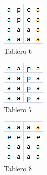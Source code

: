 \begin{figure}[htb]
  \begin{center}
      \includegraphics[scale=1]{imagenes/tab6.png}
  \end{center}
  \caption{Tablero 6}\label{fig:tab6}
\end{figure}

\begin{figure}[htb]
  \begin{center}
      \includegraphics[scale=1]{imagenes/tab7.png}
  \end{center}
  \caption{Tablero 7}\label{fig:tab7}
\end{figure}

\begin{figure}[htb]
  \begin{center}
      \includegraphics[scale=1]{imagenes/tab8.png}
  \end{center}
  \caption{Tablero 8}\label{fig:tab8}
\end{figure}

